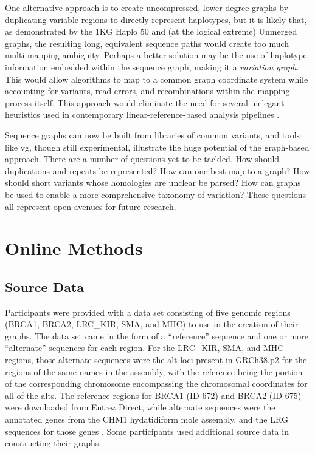 One alternative approach is to create uncompressed, lower-degree graphs
by duplicating variable regions to directly represent haplotypes, but it
is likely that, as demonstrated by the 1KG Haplo 50 and (at the logical
extreme) Unmerged graphs, the resulting long, equivalent sequence paths
would create too much multi-mapping ambiguity. Perhaps a better solution
may be the use of haplotype information embedded within the sequence
graph\cite{novak2016graph}, making it a \emph{variation graph}. This would
allow algorithms to map to a common graph coordinate system while
accounting for variants, read errors, and recombinations within the
mapping process itself. This approach would eliminate the need for
several inelegant heuristics used in contemporary linear-reference-based
analysis pipelines
\cite{1000_Genomes_Project_Consortium2012-gr,McKenna2010-bg}.

Sequence graphs can now be built from libraries of common variants, and
tools like vg, though still experimental, illustrate the huge potential
of the graph-based approach. There are a number of questions yet to be
tackled. How should duplications and repeats be represented? How can one
best map to a graph? How should short variants whose homologies are
unclear be parsed? How can graphs be used to enable a more comprehensive
taxonomy of variation? These questions all represent open avenues for
future research.

\section{Online Methods}

\subsection{Source Data}

Participants were provided with a data set consisting of five genomic
regions (BRCA1, BRCA2, LRC\_KIR, SMA, and MHC) to use in the creation of
their graphs. The data set came in the form of a ``reference'' sequence
and one or more ``alternate'' sequences for each region. For the
LRC\_KIR, SMA, and MHC regions, those alternate sequences were the alt
loci present in GRCh38.p2 for the regions of the same names in the
assembly, with the reference being the portion of the corresponding
chromosome encompassing the chromosomal coordinates for all of the alts.
The reference regions for BRCA1 (ID 672) and BRCA2 (ID 675) were
downloaded from Entrez Direct, while alternate sequences were the
annotated genes from the CHM1 hydatidiform mole assembly, and the LRG
sequences for those genes
\cite{Kans2016-ca,MacArthur2014-dh,Chaisson2015-wd}. Some participants
used additional source data in constructing their graphs.

